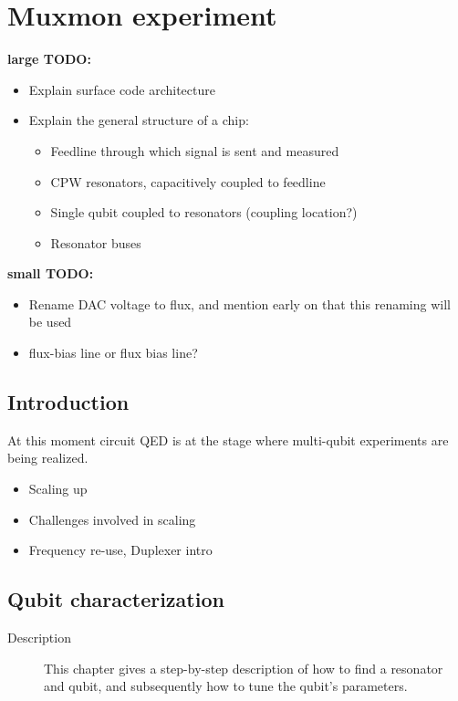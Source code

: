 

\part{Muxmon experiment}
  \textbf{large TODO:}
  \begin{itemize}
    \item Explain surface code architecture
    \item Explain the general structure of a chip:
    \begin{itemize}
      \item Feedline through which signal is sent and measured
      \item CPW resonators, capacitively coupled to feedline
      \item Single qubit coupled to resonators (coupling location?)
      \item Resonator buses
    \end{itemize}
  \end{itemize}

  \textbf{small TODO:}
  \begin{itemize}
    \item Rename DAC voltage to flux, and mention early on that this renaming will be used
    \item flux-bias line or flux bias line?
  \end{itemize}



  \chapter*{Introduction}

    At this moment circuit QED is at the stage where multi-qubit experiments are being realized.

    \begin{itemize}
        \item Scaling up
        \item Challenges involved in scaling
        \item Frequency re-use, Duplexer intro
    \end{itemize}





  \chapter{Qubit characterization}
    \begin{description}
     \item[Description] This chapter gives a step-by-step description of how to find a resonator and qubit, and subsequently how to tune the qubit's parameters.
     \end{description}

